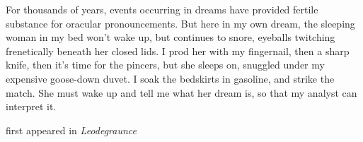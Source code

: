 For thousands of years, events occurring in dreams have provided fertile
substance for oracular pronouncements. But here in my own dream, the
sleeping woman in my bed won't wake up, but continues to snore, eyeballs
twitching frenetically beneath her closed lids. I prod her with my
fingernail, then a sharp knife, then it's time for the pincers, but she
sleeps on, snuggled under my expensive goose-down duvet. I soak the
bedskirts in gasoline, and strike the match. She must wake up and tell
me what her dream is, so that my analyst can interpret it.

first appeared in \emph{Leodegraunce}
